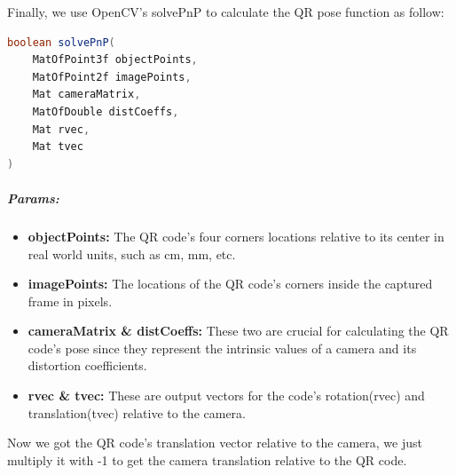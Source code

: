 Finally, we use OpenCV's solvePnP to calculate the QR pose function as follow:

\begin{lstlisting}[language=Java]
boolean solvePnP(
	MatOfPoint3f objectPoints, 
	MatOfPoint2f imagePoints, 
	Mat cameraMatrix, 
	MatOfDouble distCoeffs, 
	Mat rvec, 
	Mat tvec
)
\end{lstlisting}

\subparagraph{Params:}

\begin{itemize}
	\item \textbf{objectPoints:}
	The QR code's four corners locations relative to its center in real world units, such as cm, mm, etc.
	\item \textbf{imagePoints:}
	The locations of the QR code's corners inside the captured frame in pixels.
	
	\item \textbf{cameraMatrix \& distCoeffs:}
	These two are crucial for calculating the QR code's pose since they represent the intrinsic values of a camera and its distortion coefficients.
	
	\item \textbf{rvec \& tvec:}
	These are output vectors for the code's rotation(rvec) and translation(tvec) relative to the camera.
\end{itemize}

Now we got the QR code's translation vector relative to the camera, we just multiply it with -1 to get the camera translation relative to the QR code.